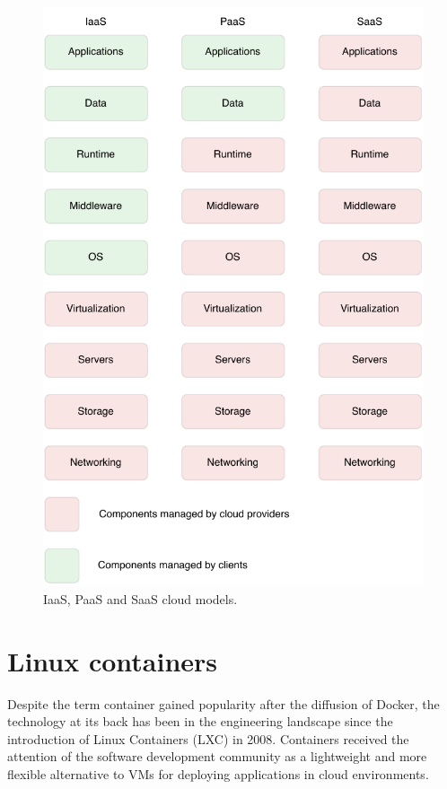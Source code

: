 \begin{figure}[htbp]
    \vspace{10pt}
    \centering
    \includegraphics{assets/iaas_paas_saas.pdf}
    \caption{IaaS, PaaS and SaaS cloud models.}
    \label{fig:iaas_paas_saas}
    \vspace{10pt}
\end{figure}
 
\section{Linux containers}
Despite the term container gained popularity after the diffusion of Docker, the technology at its back has been in the engineering landscape since the introduction of Linux Containers (LXC) \cite{LinuxContainers} in 2008. Containers received the attention of the software development community as a lightweight and more flexible alternative to VMs for deploying applications in cloud environments.

